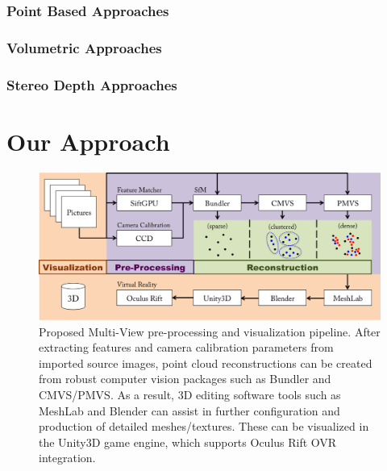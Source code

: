 \documentclass[10pt,twocolumn,letterpaper]{article}
\begin{document}
\subsubsection{Point Based Approaches}


\subsubsection{Volumetric Approaches}


\subsubsection{Stereo Depth Approaches}



\section{Our Approach}


\begin{figure}[t]
  \begin{center}
    \includegraphics[width=\linewidth]{pipeline.png}
  \end{center}
  \caption{Proposed Multi-View pre-processing and visualization pipeline.  After extracting features and camera calibration parameters from imported source images, point cloud reconstructions can be created from robust computer vision packages such as Bundler and CMVS/PMVS.  As a result, 3D editing software tools such as MeshLab and Blender can assist in further configuration and production of detailed meshes/textures.  These can be visualized in the Unity3D game engine, which supports Oculus Rift OVR integration.}
  \label{fig:short}
\end{figure}
\end{document}
